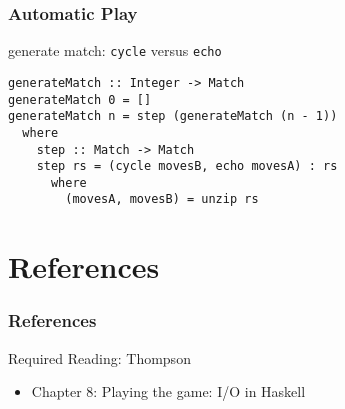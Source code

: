 \documentclass[dvipsnames]{beamer}
\theoremstyle{plain}
\begin{document}
\begin{frame}[fragile]
  \frametitle{Automatic Play}

  \begin{exampleblock}{generate match:
      \lstinline[deletekeywords={cycle}]|cycle| versus \lstinline|echo|}
    \begin{lstlisting}[deletekeywords={cycle}]
generateMatch :: Integer -> Match
generateMatch 0 = []
generateMatch n = step (generateMatch (n - 1))
  where
    step :: Match -> Match
    step rs = (cycle movesB, echo movesA) : rs
      where
        (movesA, movesB) = unzip rs
    \end{lstlisting}
  \end{exampleblock}
\end{frame}

\section*{References}

\begin{frame}
  \frametitle{References}

  \begin{block}{Required Reading: Thompson}
    \begin{itemize}
      \item Chapter 8: \alert{Playing the game: I/O in Haskell}
    \end{itemize}
  \end{block}
\end{frame}
\end{document}
